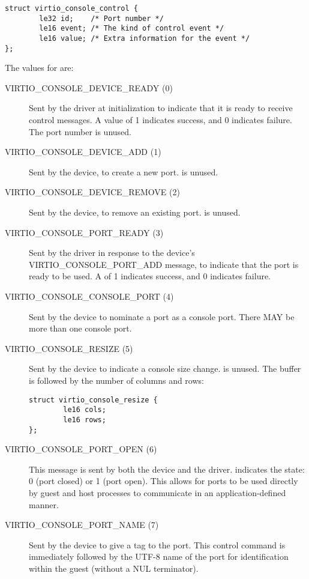 \begin{lstlisting}
struct virtio_console_control {
        le32 id;    /* Port number */
        le16 event; /* The kind of control event */
        le16 value; /* Extra information for the event */
};
\end{lstlisting}

The values for  are:
\begin{description}
\item [VIRTIO_CONSOLE_DEVICE_READY (0)] Sent by the driver at initialization
  to indicate that it is ready to receive control messages.  A value of
  1 indicates success, and 0 indicates failure.  The port number  is unused.
\item [VIRTIO_CONSOLE_DEVICE_ADD (1)] Sent by the device, to create a new
  port.   is unused.
\item [VIRTIO_CONSOLE_DEVICE_REMOVE (2)] Sent by the device, to remove an
  existing port.  is unused.
\item [VIRTIO_CONSOLE_PORT_READY (3)] Sent by the driver in response
  to the device's VIRTIO_CONSOLE_PORT_ADD message, to indicate that
  the port is ready to be used. A  of 1 indicates success, and 0
  indicates failure.
\item [VIRTIO_CONSOLE_CONSOLE_PORT (4)] Sent by the device to nominate
  a port as a console port.  There MAY be more than one console port.
\item [VIRTIO_CONSOLE_RESIZE (5)] Sent by the device to indicate
  a console size change.   is unused.  The buffer is followed by the number of columns and rows:
\begin{lstlisting}
struct virtio_console_resize {
        le16 cols;
        le16 rows;
};
\end{lstlisting}
\item [VIRTIO_CONSOLE_PORT_OPEN (6)] This message is sent by both the
  device and the driver.   indicates the state: 0 (port
  closed) or 1 (port open).  This allows for ports to be used directly
  by guest and host processes to communicate in an application-defined
  manner.
\item [VIRTIO_CONSOLE_PORT_NAME (7)] Sent by the device to give a tag
  to the port.  This control command is immediately
  followed by the UTF-8 name of the port for identification
  within the guest (without a NUL terminator).
\end{description}


